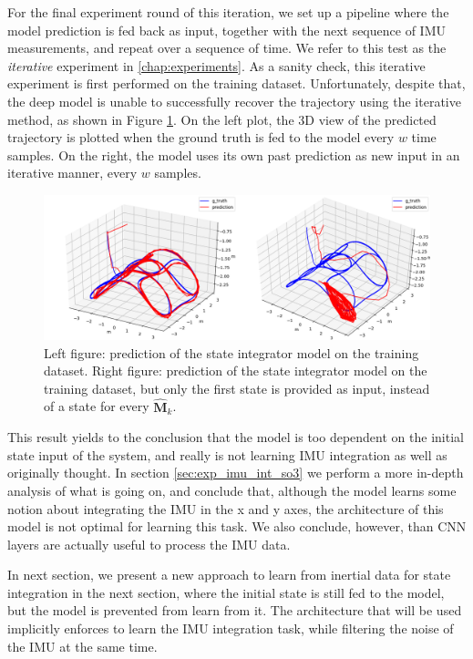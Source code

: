 For the final experiment round of this iteration, we set up a pipeline where the model prediction is fed back as input, together with the next sequence of IMU measurements, and repeat over a sequence of time. 
We refer to this test as the \emph{iterative} experiment in \ref{chap:experiments}. 
As a sanity check, this iterative experiment is first performed on the training dataset.
Unfortunately, despite that, the deep model is unable to successfully recover the trajectory using the iterative method, as shown in Figure \ref{fig:iterative_exp_fail}.
On the left plot, the 3D view of the predicted trajectory is plotted when the ground truth is fed to the model every $w$ time samples.
On the right, the model uses its own past prediction as new input in an iterative manner, every $w$ samples.
\begin{figure}
    \centering
    \includegraphics[width=\textwidth,height=\textheight,keepaspectratio]{thesis_template/img/iterative_exp_vs_gt.png}
    \caption{Left figure: prediction of the state integrator model on the training dataset. Right figure: prediction of the state integrator model on the training dataset, but only the first state is provided as input, instead of a state for every $\mathbf{\hat{M}}_k$.}
    \label{fig:iterative_exp_fail}
\end{figure}

This result yields to the conclusion that the model is too dependent on the initial state input of the system, and really is not learning IMU integration as well as originally thought. 
In section \ref{sec:exp_imu_int_so3} we perform a more in-depth analysis of what is going on, and conclude that, although the model learns some notion about integrating the IMU in the x and y axes, the architecture of this model is not optimal for learning this task.
We also conclude, however, than CNN layers are actually useful to process the IMU data.

In next section, we present a new approach to learn from inertial data for state integration in the next section, where the initial state is still fed to the model, but the model is prevented from learn from it.
The architecture that will be used implicitly enforces to learn the IMU integration task, while filtering the noise of the IMU at the same time.


